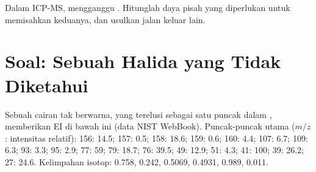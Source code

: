 \begin{exercise}[$\star\star\star$]\label{exo:b2:mass-spec-atomic:12}
Dalam ICP-MS,  mengganggu . Hitunglah daya
pisah yang diperlukan untuk memisahkan keduanya, dan usulkan jalan keluar
lain.
\end{exercise}

\section{Soal: Sebuah Halida yang Tidak Diketahui}

\begin{problem}
\label{pb:b2:mass-spec-atomic:1}
Sebuah cairan tak berwarna, yang terelusi sebagai satu puncak dalam
, memberikan  EI di bawah ini (data NIST
WebBook). Puncak-puncak utama ($m/z$: intensitas relatif): 156: 14.5; 157: 0.5; 158: 18.6; 159: 0.6; 160:
4.4; 107: 6.7; 109: 6.3; 93: 3.3; 95: 2.9; 77: 59; 79: 18.7; 76: 39.5; 49: 12.9; 51: 4.3; 41: 100; 39:
26.2; 27: 24.6. Kelimpahan isotop:  0.758,  0.242,  0.5069,
 0.4931,  0.989,  0.011.

\begin{center}
\end{center}


\end{problem}
